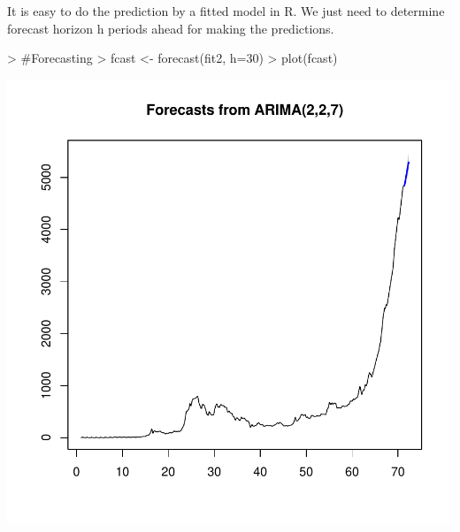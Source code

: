 \documentclass{article}
\begin{document}
It is easy to do the prediction by a fitted model in R. We just need to determine forecast horizon h periods ahead for making the predictions.
\begin{Schunk}
\begin{Sinput}
> #Forecasting
> fcast <- forecast(fit2, h=30)
> plot(fcast)
\end{Sinput}
\end{Schunk}
\includegraphics{Report-023}
\end{document}
